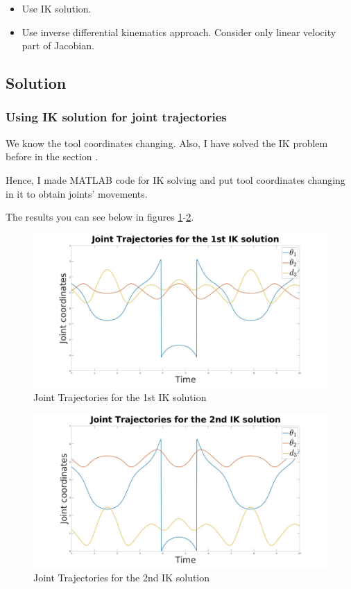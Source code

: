 \documentclass[12pt, a4paper]{report}
\begin{document}
\begin{itemize}
	\item Use IK solution.
	\item Use inverse differential kinematics approach. Consider only linear
velocity part of Jacobian.
\end{itemize}

{\centering
\subsection*{Solution}
}


{\centering
\subsubsection*{Using IK solution for joint trajectories}
}

We know the tool coordinates changing. Also, I have solved the IK problem before in the section .

Hence, I made MATLAB code for IK solving and put tool coordinates changing in it to obtain joints' movements.

The results you can see below in figures \ref{fig:mesh11}-\ref{fig:mesh12}.

\begin{figure}[H]
	\centering
		\includegraphics[width=1.0\textwidth]{Image11} %
	\caption{Joint Trajectories for the 1st IK solution} %
	\label{fig:mesh11}
\end{figure}

\begin{figure}[H]
	\centering
		\includegraphics[width=1.0\textwidth]{Image12} %
	\caption{Joint Trajectories for the 2nd IK solution} %
	\label{fig:mesh12}
\end{figure}
\end{document}
